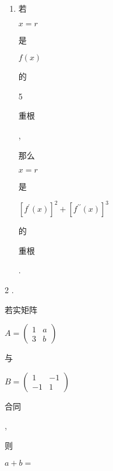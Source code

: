 \documentclass[10pt]{article}
\begin{document}
\begin{enumerate}
  \item \begin{CJK}{UTF8}{mj}若\end{CJK} $x=r$ \begin{CJK}{UTF8}{mj}是\end{CJK} $f(x)$ \begin{CJK}{UTF8}{mj}的\end{CJK} 5 \begin{CJK}{UTF8}{mj}重根\end{CJK}, \begin{CJK}{UTF8}{mj}那么\end{CJK} $x=r$ \begin{CJK}{UTF8}{mj}是\end{CJK} $\left[f^{\prime}(x)\right]^{2}+\left[f^{\prime \prime}(x)\right]^{3}$ \begin{CJK}{UTF8}{mj}的\end{CJK} \begin{CJK}{UTF8}{mj}重根\end{CJK}.
\end{enumerate}
2 . \begin{CJK}{UTF8}{mj}若实矩阵\end{CJK} $A=\left(\begin{array}{ll}1 & a \\ 3 & b\end{array}\right)$ \begin{CJK}{UTF8}{mj}与\end{CJK} $B=\left(\begin{array}{cc}1 & -1 \\ -1 & 1\end{array}\right)$ \begin{CJK}{UTF8}{mj}合同\end{CJK}, \begin{CJK}{UTF8}{mj}则\end{CJK} $a+b=$
\end{document}
